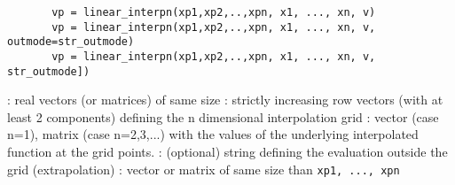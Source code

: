 

\begin{mandesc}
\end{mandesc}

\begin{calling_sequence}
   \begin{verbatim}
       vp = linear_interpn(xp1,xp2,..,xpn, x1, ..., xn, v)
       vp = linear_interpn(xp1,xp2,..,xpn, x1, ..., xn, v, outmode=str_outmode)
       vp = linear_interpn(xp1,xp2,..,xpn, x1, ..., xn, v, str_outmode])
   \end{verbatim}
\end{calling_sequence}


\begin{parameters}
  \begin{varlist}
   : real vectors (or matrices) of same size
   :  strictly increasing row vectors (with at least 2 components)
               defining the n dimensional interpolation grid
   : vector (case n=1), matrix (case n=2,3,...) with the
               values of the underlying interpolated function at the grid points.
   : (optional) string defining the evaluation outside the grid (extrapolation)
   :  vector or matrix of same size than \verb!xp1, ..., xpn!
  \end{varlist}
\end{parameters}

